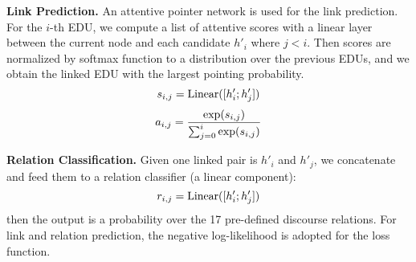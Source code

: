 \documentclass[11pt]{article}
\begin{document}
\noindent\textbf{Link Prediction.} An attentive pointer network \cite{vinyals2015pointer} is used for the link prediction. For the $i$-th EDU, we compute a list of attentive scores with a linear layer between the current node and each candidate $h'_i$ where $j<i$. Then scores are normalized by softmax function to a distribution over the previous EDUs, and we obtain the linked EDU with the largest pointing probability.
\begin{equation}
\normalsize
    s_{i,j} = \mathrm{Linear}([h'_i; h'_j])
\end{equation}
\vspace{-0.4cm}
\begin{equation}
\normalsize
    a_{i,j} = \frac{\mathrm{exp}(s_{i,j})}{\sum_{j=0}^i\mathrm{exp}(s_{i,j})}
\end{equation}

\noindent\textbf{Relation Classification.} Given one linked pair is $h'_i$ and $h'_j$, we concatenate and feed them to a relation classifier (a linear component):
\begin{equation}
\normalsize
    r_{i,j} = \mathrm{Linear}([h'_i; h'_j])
\end{equation}
then the output is a probability over the 17 pre-defined discourse relations. For link and relation prediction, the negative log-likelihood is adopted for the loss function.
\end{document}
